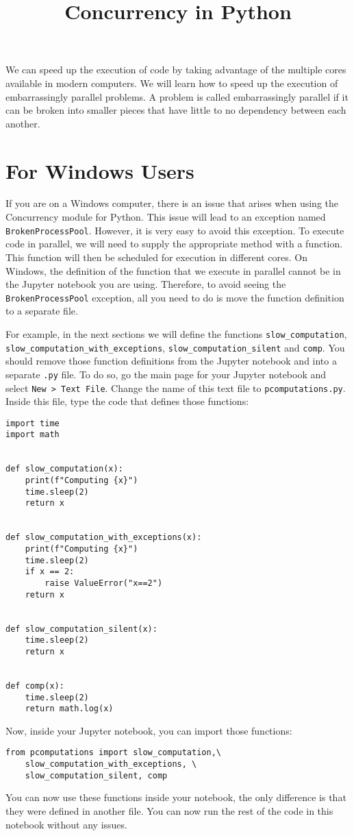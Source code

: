\documentclass[12pt, a4paper]{article}
\date{}
\title{Concurrency in Python}
\begin{document}
\maketitle
We can speed up the execution of code by taking advantage of the multiple cores available in modern computers.
We will learn how to speed up the execution of embarrassingly parallel problems.
A problem is called embarrassingly parallel if it can be broken into smaller pieces that have little to no dependency between each another.
\section{For Windows Users}
\label{sec:org6c795d9}
If you are on a Windows computer, there is an issue that arises when using the Concurrency module for Python.
This issue will lead to an exception named \texttt{BrokenProcessPool}.
However, it is very easy to avoid this exception.
To execute code in parallel, we will need to supply the appropriate method with a function.
This function will then be scheduled for execution in different cores.
On Windows, the definition of the function that we execute in parallel cannot be in the Jupyter notebook you are using.
Therefore, to avoid seeing the \texttt{BrokenProcessPool} exception, all you need to do is move the function definition to a separate file.

For example, in the next sections we will define the functions \texttt{slow\_computation}, \texttt{slow\_computation\_with\_exceptions}, \texttt{slow\_computation\_silent} and \texttt{comp}.
You should remove those function definitions from the Jupyter notebook and into a separate \texttt{.py} file.
To do so, go the main page for your Jupyter notebook and select \texttt{New > Text File}.
Change the name of this text file to \texttt{pcomputations.py}.
Inside this file, type the code that defines those functions:
\lstset{language=jupyter-python,label= ,caption= ,captionpos=b,numbers=none}
\begin{lstlisting}
import time
import math


def slow_computation(x):
    print(f"Computing {x}")
    time.sleep(2)
    return x


def slow_computation_with_exceptions(x):
    print(f"Computing {x}")
    time.sleep(2)
    if x == 2:
        raise ValueError("x==2")
    return x


def slow_computation_silent(x):
    time.sleep(2)
    return x


def comp(x):
    time.sleep(2)
    return math.log(x)
\end{lstlisting}
Now, inside your Jupyter notebook, you can import those functions:
\lstset{language=jupyter-python,label= ,caption= ,captionpos=b,numbers=none}
\begin{lstlisting}
from pcomputations import slow_computation,\
    slow_computation_with_exceptions, \
    slow_computation_silent, comp
\end{lstlisting}
You can now use these functions inside your notebook, the only difference is that they were defined in another file.
You can now run the rest of the code in this notebook without any issues.
\end{document}
